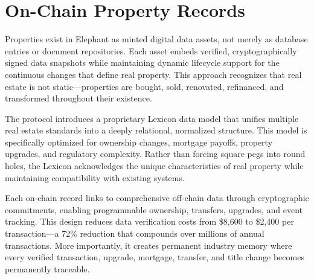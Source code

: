 \section{On-Chain Property Records}

Properties exist in Elephant as minted digital data assets, not merely as database entries or document repositories. Each asset embeds verified, cryptographically signed data snapshots while maintaining dynamic lifecycle support for the continuous changes that define real property. This approach recognizes that real estate is not static—properties are bought, sold, renovated, refinanced, and transformed throughout their existence.

The protocol introduces a proprietary Lexicon data model that unifies multiple real estate standards into a deeply relational, normalized structure. This model is specifically optimized for ownership changes, mortgage payoffs, property upgrades, and regulatory complexity. Rather than forcing square pegs into round holes, the Lexicon acknowledges the unique characteristics of real property while maintaining compatibility with existing systems.

Each on-chain record links to comprehensive off-chain data through cryptographic commitments, enabling programmable ownership, transfers, upgrades, and event tracking. This design reduces data verification costs from \$8,600 to \$2,400 per transaction—a 72\% reduction that compounds over millions of annual transactions. More importantly, it creates permanent industry memory where every verified transaction, upgrade, mortgage, transfer, and title change becomes permanently traceable.


